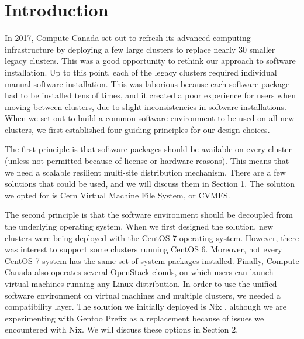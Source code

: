 \documentclass[sigconf]{acmart}
\begin{document}
%
\maketitle

\section{Introduction}
In 2017, Compute Canada set out to refresh its advanced computing infrastructure by deploying a few large clusters to
replace nearly 30 smaller legacy clusters. This was a good opportunity to rethink our approach to software
installation. Up to this point, each of the legacy clusters required individual manual software installation. This was
laborious because each software package had to be installed tens of times, and it created a poor experience for users
when moving between clusters, due to slight inconsistencies in software installations. When we set out to build a
common software environment to be used on all new clusters, we first established four guiding principles for our design
choices.

The first principle is that software packages should be available on every cluster (unless not permitted because of
license or hardware reasons). This means that we need a scalable resilient multi-site distribution mechanism. There are
a few solutions that could be used, and we will discuss them in Section 1. The solution we opted for is Cern Virtual
Machine File System, or CVMFS\cite{CVMFS}.

The second principle is that the software environment should be decoupled from the underlying operating system. When we
first designed the solution, new clusters were being deployed with the CentOS 7 operating system. However, there was
interest to support some clusters running CentOS 6. Moreover, not every CentOS 7 system has the same set of system
packages installed. Finally, Compute Canada also operates several OpenStack clouds, on which users can launch virtual
machines running any Linux distribution. In order to use the unified software environment on virtual machines and
multiple clusters, we needed a compatibility layer. The solution we initially deployed is Nix \cite{Nix}, although we
are experimenting with Gentoo Prefix \cite{Gentoo} as a replacement because of issues we encountered with Nix. We will
discuss these options in Section 2.
\end{document}

